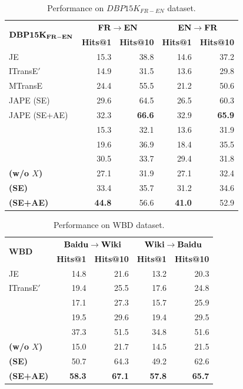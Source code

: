 \begin{table}
	\centering
	\scriptsize
	\begin{tabular}{lrrrr}
		\toprule
		\multirow{2}{*}{$\bf DBP15K_{FR-EN}$} & \multicolumn{2}{c|}{$\bf FR \rightarrow EN$} & \multicolumn{2}{c}{$\bf EN \rightarrow FR$} \\
		& \bf Hits@1 & \bf Hits@10 & \bf Hits@1 & \bf Hits@10 \\
		\midrule
		\rowcolor{Gray}JE & 15.3 & 38.8 & 14.6 & 37.2 \\
		ITransE$'$ & 14.9 & 31.5 & 13.6 & 29.8 \\
		\rowcolor{Gray}MTransE & 24.4 & 55.5 & 21.2 & 50.6 \\
		JAPE (SE) & 29.6 & 64.5 & 26.5 & 60.3 \\
		\rowcolor{Gray}JAPE (SE+AE) & 32.3 & \bf 66.6 & 32.9 & \bf 65.9 \\
		\GCN & 15.3 & 32.1 & 13.6 & 31.9 \\
		\rowcolor{Gray}\HGCN & 19.6 & 36.9 & 18.4 & 35.5 \\
		\RGCN & 30.5 & 33.7 & 29.4 & 31.8 \\
		\rowcolor{Gray}\bf \HRGCN (w/o $X$) & 27.1 & 31.9 & 27.1 & 32.4 \\
		\bf \HRGCN (SE) & 33.4& 35.7& 31.2& 34.6 \\
		\rowcolor{Gray} 	\bf \HRGCN (SE+AE) & \bf 44.8 & 56.6 &\bf 41.0 & 52.9 \\
		\bottomrule
	\end{tabular}
	\caption{Performance on $DBP15K_{FR-EN}$ dataset.}
	\label{cross}
\end{table}

\begin{table}
	\centering
	\scriptsize
	\begin{tabular}{lrrrr}
		\toprule
		\multirow{2}{*}{\bf WBD} &  \multicolumn{2}{c|}{$\bf Baidu \rightarrow Wiki$} & \multicolumn{2}{c}{$\bf Wiki \rightarrow Baidu$} \\
		& \bf Hits@1 & \bf Hits@10 & \bf Hits@1 & \bf Hits@10 \\
		\midrule
		\rowcolor{Gray} JE & 14.8 & 21.6 & 13.2 & 20.3 \\
		ITransE$'$ & 19.4 & 25.5 & 17.6 & 24.8 \\
		\rowcolor{Gray} \GCN & 17.1 & 27.3 & 15.7 & 25.9 \\
		\HGCN & 19.5 & 29.6 & 19.4 & 29.5  \\
		\rowcolor{Gray} \RGCN & 37.3 & 51.5 & 34.8 & 51.6 \\
		\bf \HRGCN (w/o $X$) & 15.0 & 21.7 & 14.5 & 21.5 \\
		\rowcolor{Gray} \bf \HRGCN (SE) & 50.7 & 64.3 & 49.2 & 62.6 \\
		\bf \HRGCN (SE+AE) & \bf 58.3 & \bf 67.1 & \bf 57.8{\tiny } & \bf 65.7 \\
		\bottomrule
	\end{tabular}
	\caption{Performance on WBD dataset.}
	\label{f1}
\end{table}

